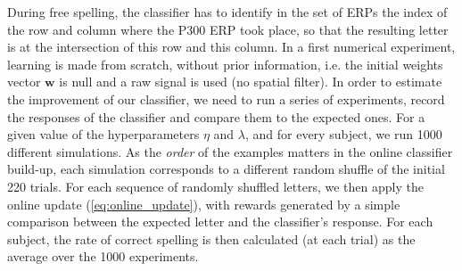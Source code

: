 \documentclass[conference]{IEEEtran}
\begin{document}
During free spelling, the classifier has to identify in the set of ERPs the index of the row and column where the P300 ERP
took place, so that the resulting letter is at the intersection of this row and this column. 
In a first numerical experiment, learning is made from scratch, without prior information,
i.e. the initial weights vector $\boldsymbol{w}$ is null
and a raw signal is used (no spatial filter).
In order to estimate the improvement of our classifier, we need to run a series of experiments,
record the responses of the classifier
and compare them to the expected ones. 
For a given value of the hyperparameters $\eta$ and $\lambda$, and for every subject, we run 1000 different simulations.
As the \emph{order} of the examples matters in the online classifier build-up,
each simulation corresponds to a different random shuffle of the initial 220 trials.
For each sequence of randomly shuffled letters, we then apply the 
online update (\ref{eq:online_update}), with rewards generated by a simple comparison between the expected
letter %
and the classifier's response.  
For each subject, the rate of correct spelling is then calculated
(at each trial) as the average over the 1000 experiments.
\end{document}
